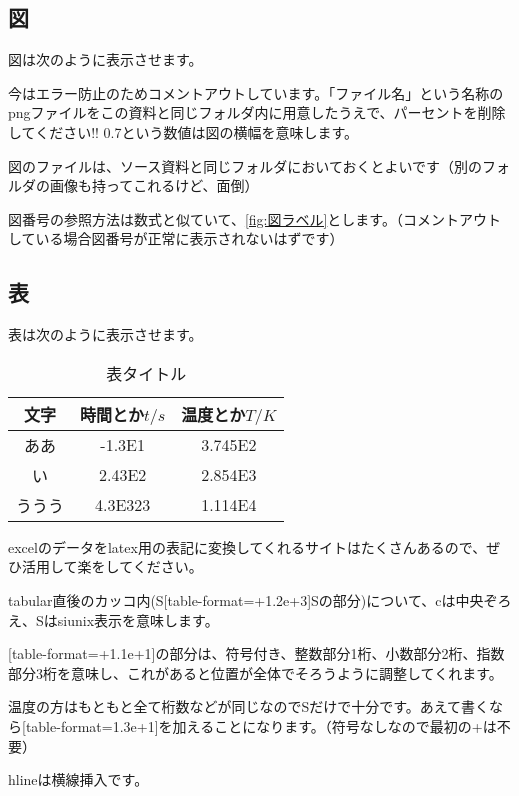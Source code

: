\documentclass[uplatex,dvipdfmx]{jsarticle}
\numberwithin{equation}{section}
\begin{document}
\subsection{図}
図は次のように表示させます。

今はエラー防止のためコメントアウトしています。「ファイル名」という名称のpngファイルをこの資料と同じフォルダ内に用意したうえで、パーセントを削除してください!!
0.7という数値は図の横幅を意味します。

図のファイルは、ソース資料と同じフォルダにおいておくとよいです（別のフォルダの画像も持ってこれるけど、面倒）

図番号の参照方法は数式と似ていて、\ref{fig:図ラベル}とします。（コメントアウトしている場合図番号が正常に表示されないはずです）
\subsection{表}
表は次のように表示させます。
\begin{table}[htbp]
  \centering
  \caption{表タイトル}
  \label{tab:TH}
  \begin{tabular}{cS[table-format=+1.2e+3]S}\hline
    {文字} & {時間とか$t / \si{s}$} & {温度とか$T / \si{K}$}\\ \hline
    ああ & -1.3E1 & 3.745E2 \\
    い & 2.43E2 & 2.854E3 \\
    ううう & 4.3E323 & 1.114E4 \\
    \hline
  \end{tabular}
\end{table}

excelのデータをlatex用の表記に変換してくれるサイトはたくさんあるので、ぜひ活用して楽をしてください。

tabular直後のカッコ内(S[table-format=+1.2e+3]Sの部分)について、cは中央ぞろえ、Sはsiunix表示を意味します。

[table-format=+1.1e+1]の部分は、符号付き、整数部分1桁、小数部分2桁、指数部分3桁を意味し、これがあると位置が全体でそろうように調整してくれます。

温度の方はもともと全て桁数などが同じなのでSだけで十分です。あえて書くなら[table-format=1.3e+1]を加えることになります。（符号なしなので最初の+は不要）

hlineは横線挿入です。
\end{document}
